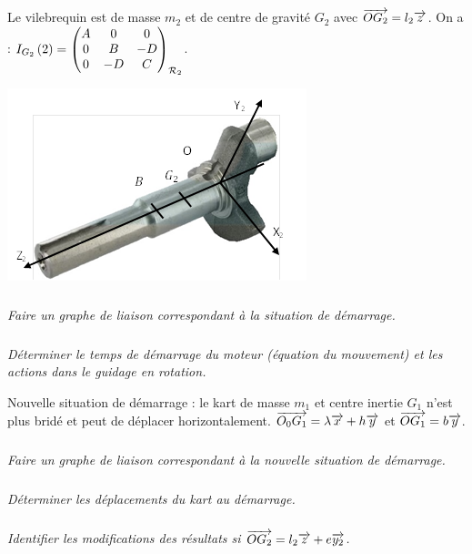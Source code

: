 \documentclass[10pt,fleqn]{article} %
\begin{document}
\begin{multicols}{2}
Le vilebrequin est de masse $m_2$ et de centre de gravité $G_2$ avec $\vect{OG_2}=l_2\vect{z}$. On a : $\inertie{G_2}{2}=\matinertie{A}{B}{C}{-D}{0}{0}{\mathcal{R}_2}$.
\begin{center}
\includegraphics[width=\linewidth]{images/fig_02}
\end{center}

\subparagraph{}\textit{Faire un graphe de liaison correspondant à la situation de démarrage.}
\subparagraph{}\textit{Déterminer le temps de démarrage du moteur (équation du mouvement) et les actions dans le guidage en rotation.}

Nouvelle situation de démarrage : le kart de masse $m_1$ et centre inertie $G_1$ n’est plus bridé et peut de déplacer horizontalement. $\vect{O_0 G_1}=\lambda \vect{x}+h\vect{y}$ et $\vect{OG_1}=b\vect{y}$.

\subparagraph{}\textit{Faire un graphe de liaison correspondant à la nouvelle situation de démarrage.}
\subparagraph{}\textit{Déterminer les déplacements du kart au démarrage.}
\subparagraph{}\textit{Identifier les modifications des résultats si $\vect{OG_2}=l_2\vect{z}+e\vect{y_2}$.}


\end{multicols}
\end{document}
